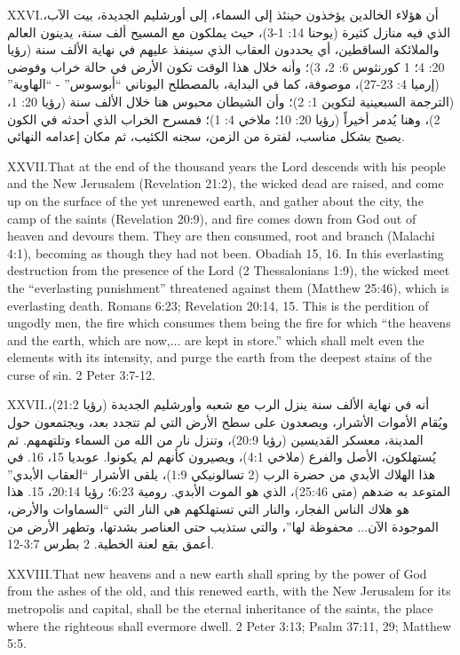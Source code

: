 \lettrine{XXVI.} أن هؤلاء الخالدين يؤخذون حينئذ إلى السماء، إلى أورشليم الجديدة، بيت الآب، الذي فيه منازل كثيرة (يوحنا 14: 1-3)، حيث يملكون مع المسيح ألف سنة، يدينون العالم والملائكة الساقطين، أي يحددون العقاب الذي سينفذ عليهم في نهاية الألف سنة (رؤيا 20: 4؛ 1 كورنثوس 6: 2، 3)؛ وأنه خلال هذا الوقت تكون الأرض في حالة خراب وفوضى (إرميا 4: 23-27)، موصوفة، كما في البداية، بالمصطلح اليوناني “أبوسوس” - “الهاوية” (الترجمة السبعينية لتكوين 1: 2)؛ وأن الشيطان محبوس هنا خلال الألف سنة (رؤيا 20: 1، 2)، وهنا يُدمر أخيراً (رؤيا 20: 10؛ ملاخي 4: 1)؛ فمسرح الخراب الذي أحدثه في الكون يصبح بشكل مناسب، لفترة من الزمن، سجنه الكئيب، ثم مكان إعدامه النهائي.


\lettrine{XXVII.} That at the end of the thousand years the Lord descends with his people and the New Jerusalem (Revelation 21:2), the wicked dead are raised, and come up on the surface of the yet unrenewed earth, and gather about the city, the camp of the saints (Revelation 20:9), and fire comes down from God out of heaven and devours them. They are then consumed, root and branch (Malachi 4:1), becoming as though they had not been. Obadiah 15, 16. In this everlasting destruction from the presence of the Lord (2 Thessalonians 1:9), the wicked meet the “everlasting punishment” threatened against them (Matthew 25:46), which is everlasting death. Romans 6:23; Revelation 20:14, 15. This is the perdition of ungodly men, the fire which consumes them being the fire for which “the heavens and the earth, which are now,... are kept in store.” which shall melt even the elements with its intensity, and purge the earth from the deepest stains of the curse of sin. 2 Peter 3:7-12.


\lettrine{XXVII.} أنه في نهاية الألف سنة ينزل الرب مع شعبه وأورشليم الجديدة (رؤيا 21:2)، ويُقام الأموات الأشرار، ويصعدون على سطح الأرض التي لم تتجدد بعد، ويجتمعون حول المدينة، معسكر القديسين (رؤيا 20:9)، وتنزل نار من الله من السماء وتلتهمهم. ثم يُستهلكون، الأصل والفرع (ملاخي 4:1)، ويصيرون كأنهم لم يكونوا. عوبديا 15، 16. في هذا الهلاك الأبدي من حضرة الرب (2 تسالونيكي 1:9)، يلقى الأشرار “العقاب الأبدي” المتوعد به ضدهم (متى 25:46)، الذي هو الموت الأبدي. رومية 6:23؛ رؤيا 20:14، 15. هذا هو هلاك الناس الفجار، والنار التي تستهلكهم هي النار التي “السماوات والأرض، الموجودة الآن... محفوظة لها”، والتي ستذيب حتى العناصر بشدتها، وتطهر الأرض من أعمق بقع لعنة الخطية. 2 بطرس 3:7-12.


\lettrine{XXVIII.} That new heavens and a new earth shall spring by the power of God from the ashes of the old, and this renewed earth, with the New Jerusalem for its metropolis and capital, shall be the eternal inheritance of the saints, the place where the righteous shall evermore dwell. 2 Peter 3:13; Psalm 37:11, 29; Matthew 5:5.


